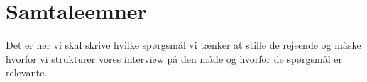 \section{Samtaleemner}
\label{ParametreSamtaleemner}
%
Det er her vi skal skrive hvilke spørgsmål vi tænker at stille de rejsende og måske hvorfor vi strukturer vores interview på den måde og hvorfor de spørgsmål er relevante. 

